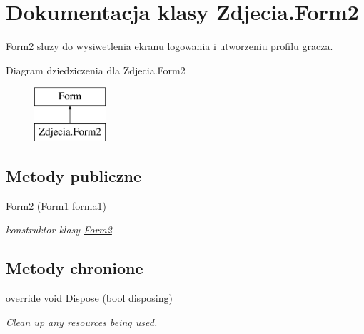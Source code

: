 \hypertarget{class_zdjecia_1_1_form2}{}\section{Dokumentacja klasy Zdjecia.\+Form2}
\label{class_zdjecia_1_1_form2}


\hyperlink{class_zdjecia_1_1_form2}{Form2} sluzy do wysiwetlenia ekranu logowania i utworzeniu profilu gracza.  


Diagram dziedziczenia dla Zdjecia.\+Form2\begin{figure}[H]
\begin{center}
\leavevmode
\includegraphics[height=2.000000cm]{class_zdjecia_1_1_form2}
\end{center}
\end{figure}
\subsection*{Metody publiczne}
\begin{DoxyCompactItemize}
\item 
\hyperlink{class_zdjecia_1_1_form2_a42e414daffdb6ffe10502528c6c96380}{Form2} (\hyperlink{class_zdjecia_1_1_form1}{Form1} forma1)\hypertarget{class_zdjecia_1_1_form2_a42e414daffdb6ffe10502528c6c96380}{}\label{class_zdjecia_1_1_form2_a42e414daffdb6ffe10502528c6c96380}

\begin{DoxyCompactList}\small\item\em konstruktor klasy \hyperlink{class_zdjecia_1_1_form2}{Form2} \end{DoxyCompactList}\end{DoxyCompactItemize}
\subsection*{Metody chronione}
\begin{DoxyCompactItemize}
\item 
override void \hyperlink{class_zdjecia_1_1_form2_ad08c002d9f33b53ceb56826d732ce8b8}{Dispose} (bool disposing)
\begin{DoxyCompactList}\small\item\em Clean up any resources being used. \end{DoxyCompactList}\end{DoxyCompactItemize}


